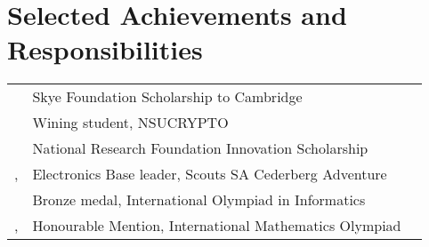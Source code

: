 \section{Selected Achievements and Responsibilities}
\begin{tabular}{R{2.5cm}|ll}
           & Skye Foundation Scholarship to Cambridge               & \\
           & Wining student, NSUCRYPTO                              & \\
           & National Research Foundation Innovation Scholarship    & \\
,  & Electronics Base leader, Scouts SA Cederberg Adventure & \\
           & Bronze medal, International Olympiad in Informatics    & \\
,  & Honourable Mention, International Mathematics Olympiad & \\
\end{tabular}

